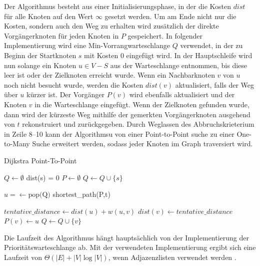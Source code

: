 Der Algorithmus besteht aus einer Initialisierungsphase, in der die Kosten $dist$ für alle Knoten
auf den Wert $\infty$ gesetzt werden. Um am Ende nicht nur die Kosten, sondern auch den Weg zu
erhalten wird zusätzlich der direkte Vorgängerknoten für jeden Knoten in $P$ gespeichert. In
folgender Implementierung wird eine Min-Vorrangwarteschlange $Q$ verwendet, in der zu Beginn der
Startknoten $s$ mit Kosten 0 eingefügt wird. In der Hauptschleife wird nun solange ein Knoten $u \in
    V - S$ aus der Warteschlange entnommen, bis diese leer ist oder der Zielknoten erreicht wurde. Wenn
ein Nachbarknoten $v$ von $u$ noch nicht besucht wurde, werden die Kosten $dist(v)$ aktualisiert,
falls der Weg über $u$ kürzer ist. Der Vorgänger $P(v)$ wird ebenfalls aktualisiert und der Knoten
$v$ in die Warteschlange eingefügt. Wenn der Zielknoten gefunden wurde, dann wird der kürzeste Weg
mithilfe der gemerkten Vorgängerknoten ausgehend von $t$ rekonstruiert und zurückgegeben. Durch
Weglassen des Abbruchskrieterium in Zeile 8--10 kann der Algorithmsu von einer Point-to-Point suche
zu einer One-to-Many Suche erweitert werden, sodass jeder Knoten im Graph traversiert wird.
\begin{algorithm}[H]
    \caption{Dijkstra Point-To-Point}
    \label{algo:dijkstra}
    \begin{algorithmic}[1]
        \State $Q \gets \emptyset$
        \State dist(s) = 0
        \State $P \gets \emptyset$ 
        \State $Q \gets Q \cup \{s\}$ 

        \State $u = \gets \text{pop(Q)}$
        \State \Return shortest\_path(P,t)
        \EndIf

        \State $tentative\_distance \gets dist(u) + w(u,v)$
        \State $dist(v) \gets tentative\_distance$
        \State $P(v) \gets u$
        \State $Q \gets Q \cup \{v\}$
        \EndIf
        \EndFor
        \EndWhile
        \EndFunction
    \end{algorithmic}
\end{algorithm}
Die Laufzeit des Algorithmus hängt hauptsächlich von der Implementierung der Prioritätswarteschlange
ab. Mit der verwendeten Implementierung ergibt sich eine Laufzeit von $\Theta(|E| + |V| \log |V|)$,
wenn Adjazenzlisten verwendet werden \cite{intro.algo}.


